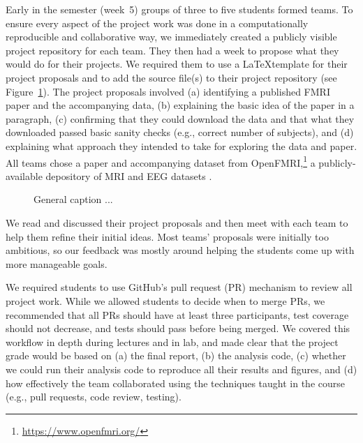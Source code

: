 Early in the semester (week~5) groups of three to five students formed teams.
To ensure every aspect of the project work was done in a computationally
reproducible and collaborative way, we immediately created a publicly visible
project repository for each team.
They then had a week to propose what they would do for their projects.
We required them to use a \LaTeX template for their project proposals
and to add the source file(s) to their project repository (see Figure~\ref{fig:repo}).
The project proposals involved
(a) identifying a published FMRI paper and the accompanying data,
(b) explaining the basic idea of the paper in a paragraph,
(c) confirming that they could download the data and that what they
downloaded passed basic sanity checks (e.g., correct number of subjects), and
(d) explaining what approach they intended to take for exploring
the data and paper.
All teams chose a paper and accompanying dataset from
OpenFMRI,\footnote{\url{https://www.openfmri.org/}} a publicly-available
depository of MRI and EEG datasets
\citep{poldrack2013toward,poldrack2015openfmri}.


\begin{figure}
\centering

\caption{General caption ...}
\label{fig:repo}
\end{figure}

We read and discussed their project proposals and then meet with each
team to help them refine their initial ideas.
Most teams' proposals were initially too ambitious, so our feedback
was mostly around helping the students come up with more manageable
goals.

We required students to use GitHub's pull request (PR) mechanism to review all
project work.
While we allowed students to decide when to merge PRs, we recommended that
all PRs should have at least three participants, test coverage should not decrease,
and tests should pass before being merged.
We covered this workflow in depth during lectures and in lab,
and made clear that the project grade would be based on
(a) the final report,
(b) the analysis code,
(c) whether we could run their analysis code to reproduce all
their results and figures, and
(d) how effectively the team collaborated using the techniques
taught in the course (e.g., pull requests, code review, testing).

